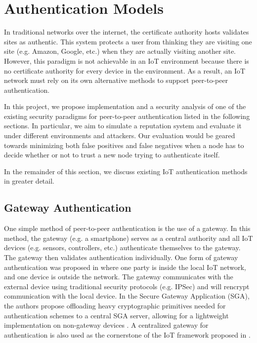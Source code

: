 
\section{Authentication Models}
\label{sec:otherauth}

In traditional networks over the internet, the certificate authority hosts validates sites as authentic. This system protects a user from thinking they are visiting one site (e.g. Amazon, Google, etc.) when they are actually visiting another site. However, this paradigm is not achievable in an \gls{IoT} environment because there is no certificate authority for every device in the environment. As a result, an \gls{IoT} network must rely on its own alternative methods to support peer-to-peer authentication.

In this project, we propose implementation and a security analysis of one of the existing security paradigms for peer-to-peer authentication listed in the following sections. In particular, we aim to simulate a reputation system and evaluate it under different environments and attackers. Our evaluation would be geared towards minimizing both false positives and false negatives when a node has to decide whether or not to trust a new node trying to authenticate itself.

In the remainder of this section, we discuss existing \gls{IoT} authentication methods in greater detail.

\subsection{Gateway Authentication}

One simple method of peer-to-peer authentication is the use of a gateway. In this method, the gateway (e.g. a smartphone) serves as a central authority and all \gls{IoT} devices (e.g. sensors, controllers, etc.) authenticate themselves to the gateway. The gateway then validates authentication individually. One form of gateway authentication was proposed in \cite{gatewayauth} where one party is inside the local \gls{IoT} network, and one device is outside the network. The gateway communicates with the external device using traditional security protocols (e.g. IPSec) and will rencrypt communication with the local device. In the Secure Gateway Application (SGA), the authors propose offloading heavy cryptographic primitives needed for authentication schemes to a central SGA server, allowing for a lightweight implementation on non-gateway devices \cite{Gateway2016}. A centralized gateway for authentication is also used as the cornerstone of the \gls{IoT} framework proposed in \cite{AuthZ}.

